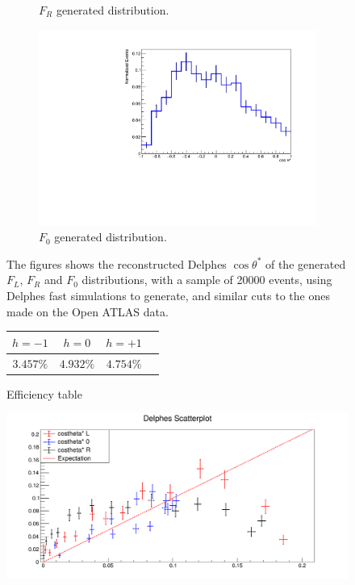 \documentclass[12pt,a4paper]{article}
\numberwithin{equation}{section}
\begin{document}
\begin{figure}[t!]
\begin{subfigure}[t]{0.5\textwidth}
    \caption{$F_R$ generated distribution.}
  \end{subfigure}
  \begin{subfigure}[t]{0.5\textwidth}
    \centering
    \includegraphics[width=1.0\textwidth]{figures/delphes_ctstar0}
    \caption{$F_0$ generated distribution.}
  \end{subfigure}
  \caption{The figures shows the reconstructed Delphes $\cos \theta^*$ of the
    generated $F_L$, $F_R$ and $F_0$ distributions, with a sample of 20000
    events, using Delphes fast simulations to generate, and similar cuts to
    the ones made on the Open ATLAS data.}\label{fig:redelphesdist}
\end{figure}

\begin{figure}[ht]
  \centering
  \begin{tabular}[H]{|c|c|c|c|}
    \hline
    $h=-1$ & $h=0$ & $h=+1$\\\hline
    $3.457\%$ & $4.932\%$ & $4.754\%$\\\hline
  \end{tabular}
  \caption{\label{fig:delphesefficiency}Efficiency table}
\end{figure}


\begin{figure}[H]
  \centering
  \includegraphics[width=\linewidth]{figures/scatterplot}
  \caption{\label{fig:scatterplot}}
\end{figure}
\end{document}
